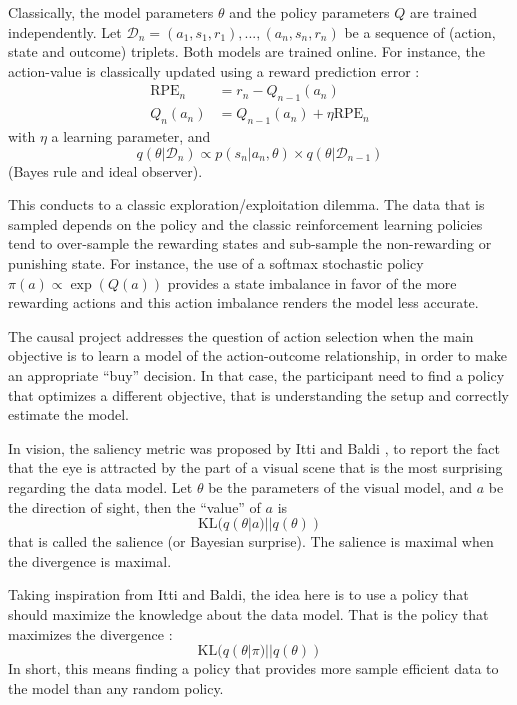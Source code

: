 \documentclass[10pt,letterpaper]{article}
\begin{document}
Classically, the model parameters $\theta$ and the policy parameters $Q$ are trained independently. 
Let $\mathcal{D}_n = (a_1, s_1, r_1), ..., (a_n, s_n, r_n)$ be a sequence of (action, state and outcome) triplets.
Both models are trained online.
For instance, the action-value is classically updated using a reward prediction error : 
\begin{align}
     \text{RPE}_n &= r_n - Q_{n-1}(a_n)\nonumber\\
     Q_n(a_n) &= Q_{n-1}(a_n) + \eta \text{RPE}_n\nonumber
\end{align}
with $\eta$ a learning parameter, and
$$q(\theta|\mathcal{D}_n) \propto p(s_n|a_n, \theta) \times q(\theta|\mathcal{D}_{n-1})$$
(Bayes rule and ideal observer).

This conducts to a classic exploration/exploitation dilemma. The data that is sampled depends on the policy and the classic reinforcement learning policies tend to over-sample the rewarding states and sub-sample the non-rewarding or punishing state.  For instance, the use of a softmax stochastic policy $\pi(a) \propto \exp(Q(a))$ provides a state imbalance in favor of the more rewarding actions and this action imbalance renders the model less accurate.

The causal project addresses the question of action selection when the main objective is to learn a model of the action-outcome relationship, in order to make an appropriate ``buy'' decision. In that case, the participant need to find a policy that optimizes a different objective, that is understanding the setup and correctly estimate the model.

In vision, the saliency metric was proposed by Itti and Baldi \cite{itti2009bayesian}, to report the fact that the eye is attracted by the part of a visual scene that is the most surprising regarding the data model.
Let $\theta$ be the parameters of the visual model, and $a$ be the direction of sight, then the ``value'' of $a$ is $$\text{KL}(q(\theta|a)||q(\theta))$$ that is called the salience (or Bayesian surprise). The salience is maximal when the divergence is maximal.

Taking inspiration from Itti and Baldi, the idea here is to use a policy that should maximize the knowledge about the data model. That is the policy that maximizes the divergence :
$$\text{KL}(q(\theta|\pi)||q(\theta))$$
In short, this means  finding a policy that provides more sample efficient data to the model than any random policy.
\end{document}
